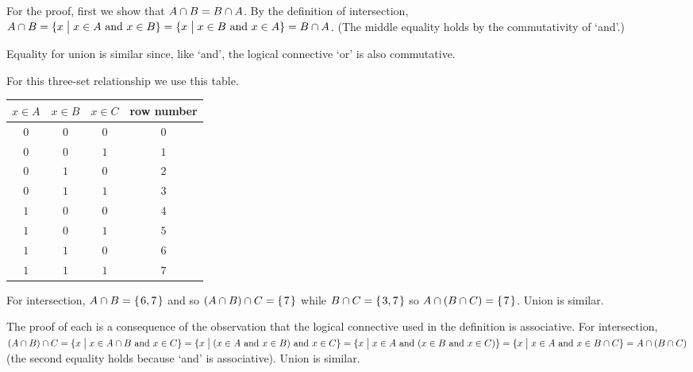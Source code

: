 \documentclass{ibl}  %
\begin{document}
\begin{ex}
\begin{ans}
\begin{items}
  For the proof, first we show that
  $A\cap B=B\cap A$.
  By the definition of intersection,  
  $A\cap B=\{x \bigm| \text{$x\in A$ and $x\in B$}\}
    =\{x \bigm| \text{$x\in B$ and $x\in A$}\}=B\cap A$.
  (The middle equality holds by the commutativity of `and'.)

  Equality for union is similar since, like `and', the logical connective
  `or' is also commutative.
\item For this three-set relationship we use this table.
  \begin{center} \small
    \begin{tabular}{ccc|c}
      $x\in A$  &$x\in B$  &$x\in C$  &row number \\ \hline
         $0$    &$0$       &$0$       &$0$    \\
         $0$    &$0$       &$1$       &$1$    \\
         $0$    &$1$       &$0$       &$2$    \\
         $0$    &$1$       &$1$       &$3$    \\[.5ex]
         $1$    &$0$       &$0$       &$4$    \\
         $1$    &$0$       &$1$       &$5$    \\
         $1$    &$1$       &$0$       &$6$    \\
         $1$    &$1$       &$1$       &$7$    
    \end{tabular}
  \end{center}
  For intersection, $A\cap B=\mbox{$\{\hspace{0.1em}6,7\hspace{0.1em}\}$}$ and so
  $(A\cap B)\cap C=\mbox{$\{\hspace{0.1em}7\hspace{0.1em}\}$}$ while
  $B\cap C=\mbox{$\{\hspace{0.1em}3,7\hspace{0.1em}\}$}$ so $A\cap(B\cap C)=\mbox{$\{\hspace{0.1em}7\hspace{0.1em}\}$}$.
  Union is similar.

  The proof of each is a consequence of the observation that the 
  logical connective used in the definition is associative.
  For intersection,
  $(A\cap B)\cap C=
    \{x \bigm| \text{$x\in A\cap B$ and $x\in C$}\}
    =
    \{x \bigm| \text{($x\in A$ and $x\in B$) and $x\in C$}\}
    =
    \{x \bigm| \text{$x\in A$ and ($x\in B$ and $x\in C$)}\}
   =
    \{x \bigm| \text{$x\in A$ and $x\in B\cap C$}\}
   =
   A\cap (B\cap C)$
   (the second equality holds because `and' is associative).
   Union is similar.
\end{items}
\end{ans}
\end{ex}
\end{document}
